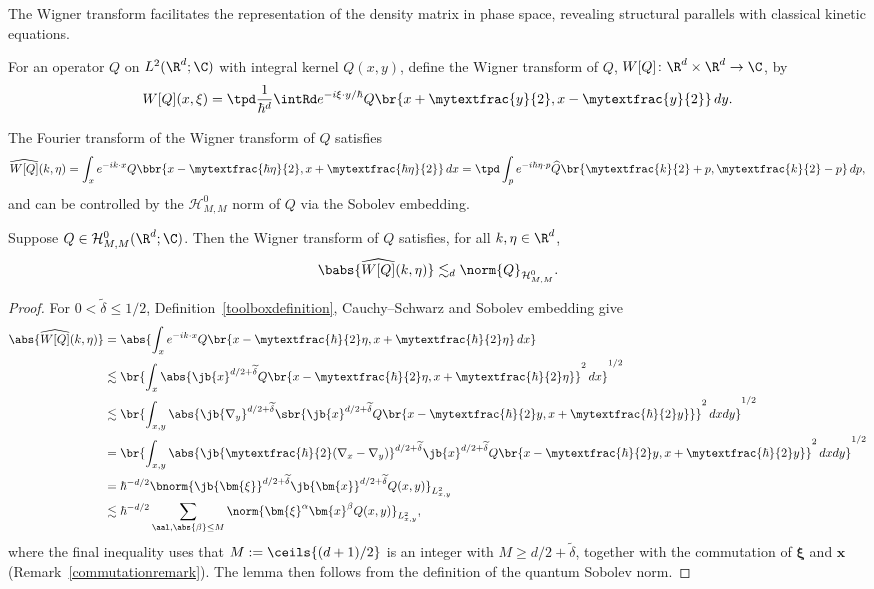 The Wigner transform facilitates the representation of the density matrix in phase space, revealing structural parallels with classical kinetic equations.
\begin{definition}\label{Wignerdefinition}
For an operator $Q$ on $L^2(\R^d;\C)$ with integral kernel $Q(x,y)$, define the Wigner transform of $Q$, $W[Q]\colon\R^d\times\R^d\to\C$, by\vspace{-3pt}
\begin{align*}
W[Q](x,\xi)= \tpd\frac{1}{\hbar^d}\intRd e^{-i\xi\cdot y/\hbar}Q\br{x+\mytextfrac{y}{2},x-\mytextfrac{y}{2}}\,dy.
\end{align*}
\end{definition}
The Fourier transform of the Wigner transform of $Q$ satisfies\vspace{-3pt}
\begin{align*}
\widehat{W[Q]}(k,\eta)=\int_xe^{-ik\cdot x}Q\bbr{x-\mytextfrac{\hbar \eta}{2},x+\mytextfrac{\hbar \eta}{2}}\,dx=\tpd\int_p e^{-i\hbar\eta\cdot p }\widehat{Q}\br{\mytextfrac{k}{2}+p,\mytextfrac{k}{2}-p}\,dp,
\end{align*}and can be controlled by the $\mathcal H_{M,M}^{0}$ norm of $Q$ via the Sobolev embedding.
\begin{lemma}\label{FTofWignertransform}
Suppose $Q\in\mathcal H^0_{M,M}(\R^d;\C)$. Then the Wigner transform of $Q$ satisfies, for all $k,\eta\in\R^d$,
\begin{align*}
\babs{\widehat {W[Q]}(k,\eta)}\lesssim_d\norm{Q}_{\mathcal H^{0}_{M,M}}.
\end{align*}
\end{lemma}
\begin{proof}
For $0<\widetilde\delta\leq1/2$, Definition~\ref{toolboxdefinition}, Cauchy--Schwarz and Sobolev embedding give
\begin{align*}
\abs{\widehat{W[Q]}(k,\eta)}&=\abs{\int_x e^{-ik\cdot x}Q\br{x-\mytextfrac{\hbar}{2}\eta,x+\mytextfrac{\hbar}{2}\eta}\,dx}\\
&\lesssim\br{\int_x\abs{\jb{x}^{{{d/2}+\widetilde\delta}}Q\br{x-\mytextfrac{\hbar}{2}\eta,x+\mytextfrac{\hbar}{2}\eta}}^2\,dx}^{1/2}\\
&\lesssim\br{\int_{x,y}\abs{\jb{\nabla_y}^{{d/2}+\widetilde\delta}\sbr{\jb{x}^{{{d/2}+\widetilde\delta}}Q\br{x-\mytextfrac{\hbar}{2}y,x+\mytextfrac{\hbar}{2}y}}}^2\,dxdy}^{1/2}\\
&=\br{\int_{x,y}\abs{\jb{\mytextfrac{\hbar}{2}(\nabla_x-\nabla_y)}^{{d/2}+\widetilde\delta}\jb{x}^{{{d/2}+\widetilde\delta}}Q\br{x-\mytextfrac{\hbar}{2}y,x+\mytextfrac{\hbar}{2}y}}^2\,dxdy}^{1/2}\\
&=\hbar^{-d/2}\bnorm{\jb{\bm{\xi}}^{{d/2}+\widetilde\delta}\jb{\bm{x}}^{{{d/2}+\widetilde\delta}}Q(x,y)}_{L^2_{x,y}}\\
&\lesssim\hbar^{-d/2}\sum_{\aal,\abs{\beta} \leq M}\norm{\bm{\xi}^\alpha\bm{x}^\beta Q(x,y)}_{L^2_{x,y}},
\end{align*}
where the final inequality uses that $M:=\ceils{(d+1)/2}$ is an integer with $M\geq d/2+\widetilde\delta$, together with the commutation of $\bm{\xi}$ and $\bm{x}$ (Remark~\ref{commutationremark}). The lemma then follows from the definition of the quantum Sobolev norm.
\end{proof}

